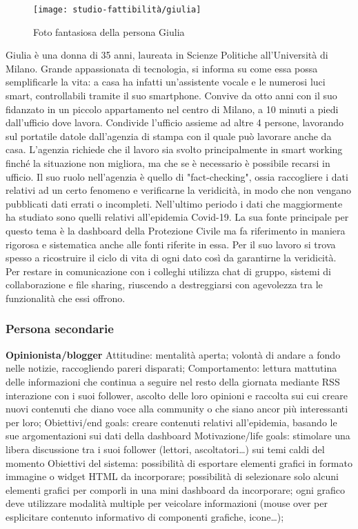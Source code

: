 \begin{wrapfigure}{r}{7cm}
    \texttt{[image: studio-fattibilità/giulia]}
    \caption{Foto fantasiosa della persona Giulia}
\end{wrapfigure}

Giulia è una donna di 35 anni, laureata in Scienze Politiche all'Università di Milano.
Grande appassionata di tecnologia, si informa su come essa possa semplificarle la vita: a casa ha infatti un'assistente vocale e le numerosi luci smart, controllabili tramite il suo smartphone.
Convive da otto anni con il suo fidanzato in un piccolo appartamento nel centro di Milano, a 10 minuti a piedi dall'ufficio dove lavora. Condivide l'ufficio assieme ad altre 4 persone, lavorando sul portatile datole dall'agenzia di stampa con il quale può lavorare anche da casa. L'agenzia richiede che il lavoro sia svolto principalmente in smart working finché la situazione non migliora, ma che se è necessario è possibile recarsi in ufficio.
Il suo ruolo nell'agenzia è quello di "fact-checking", ossia raccogliere i dati relativi ad un certo fenomeno e verificarne la veridicità, in modo che non vengano pubblicati dati errati o incompleti. 
Nell'ultimo periodo i dati che maggiormente ha studiato sono quelli relativi all'epidemia Covid-19. La sua fonte principale per questo tema è la dashboard della Protezione Civile ma fa riferimento in maniera rigorosa e sistematica anche alle fonti riferite in essa. Per il suo lavoro si trova spesso a ricostruire il ciclo di vita di ogni dato così da garantirne la veridicità. 
Per restare in comunicazione con i colleghi utilizza chat di gruppo, sistemi di collaborazione e file sharing, riuscendo a destreggiarsi con agevolezza tra le funzionalità che essi offrono. 

\subsubsection*{Persona secondarie}
\textbf{Opinionista/blogger}
	Attitudine:
		mentalità aperta;
		volontà di andare a fondo nelle notizie, raccogliendo pareri disparati;
	Comportamento: 
		lettura mattutina delle informazioni che continua a seguire nel resto della giornata mediante RSS
		interazione con i suoi follower, ascolto delle loro opinioni e raccolta sui cui creare nuovi contenuti che diano voce alla community o che siano ancor più interessanti per loro;
	Obiettivi/end goals: creare contenuti relativi all'epidemia, basando le sue argomentazioni sui dati della dashboard
	Motivazione/life goals: stimolare una libera discussione tra i suoi follower (lettori, ascoltatori…) sui temi caldi del momento
	Obiettivi del sistema:
		possibilità di esportare elementi grafici in formato immagine o widget HTML da incorporare;
		possibilità di selezionare solo alcuni elementi grafici per comporli in una mini dashboard da incorporare; 
		ogni grafico deve utilizzare modalità multiple per veicolare informazioni (mouse over per esplicitare contenuto informativo di componenti grafiche, icone…); 

